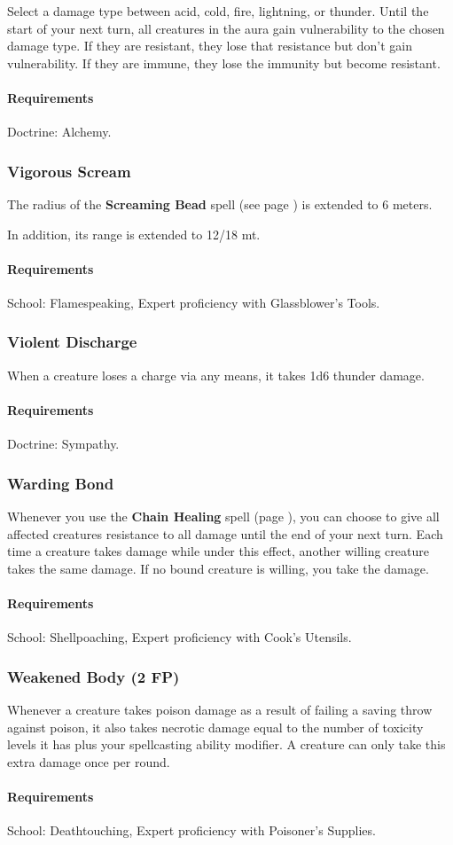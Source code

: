     Select a damage type between acid, cold, fire, lightning, or thunder.
    Until the start of your next turn, all creatures in the aura gain vulnerability to the chosen damage type.
    If they are resistant, they lose that resistance but don't gain vulnerability.
    If they are immune, they lose the immunity but become resistant.
    \paragraph{Requirements} Doctrine: Alchemy.
\subsubsection{Vigorous Scream} \label{feat::vigorousscream}
    The radius of the \textbf{Screaming Bead} spell (see page \pageref{spell::screamingbead}) is extended to 6 meters.

    In addition, its range is extended to 12/18 mt.
    \paragraph{Requirements} School: Flamespeaking, Expert proficiency with Glassblower's Tools.
\subsubsection{Violent Discharge} \label{feat::violentdischarge}
    When a creature loses a charge via any means, it takes 1d6 thunder damage.
    \paragraph{Requirements} Doctrine: Sympathy.
\subsubsection{Warding Bond} \label{feat::wardingbond}
    Whenever you use the \textbf{Chain Healing} spell (page \pageref{spell::chainhealing}), you can choose to give all affected creatures resistance to all damage until the end of your next turn.
    Each time a creature takes damage while under this effect, another willing creature takes the same damage.
    If no bound creature is willing, you take the damage.
    \paragraph{Requirements} School: Shellpoaching, Expert proficiency with Cook's Utensils.
\subsubsection{Weakened Body (2 FP)} \label{feat::weakenedbody}
    Whenever a creature takes poison damage as a result of failing a saving throw against poison, it also takes necrotic damage equal to the number of toxicity levels it has plus your spellcasting ability modifier.
    A creature can only take this extra damage once per round.
    \paragraph{Requirements} School: Deathtouching, Expert proficiency with Poisoner's Supplies.

\newpage
